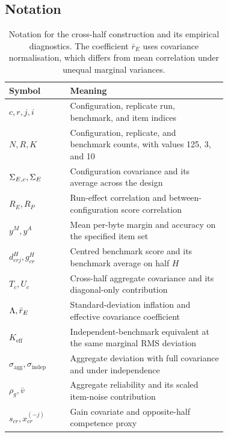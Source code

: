 \subsection{Notation}
\begin{table}[h]
\centering
\caption{Notation for the cross-half construction and its empirical diagnostics. The coefficient $\bar r_E$ uses covariance normalisation, which differs from mean correlation under unequal marginal variances.}
\small\setlength{\tabcolsep}{4pt}\renewcommand{\arraystretch}{1.12}
\begin{tabular}{lL{0.72\linewidth}}
\toprule
Symbol & Meaning\\
\midrule
$c,r,j,i$ & Configuration, replicate run, benchmark, and item indices\\
$N,R,K$ & Configuration, replicate, and benchmark counts, with values 125, 3, and 10\\
$\Sigma_{E,c},\Sigma_E$ & Configuration covariance and its average across the design\\
$R_E,R_P$ & Run-effect correlation and between-configuration score correlation\\
$y^M,y^A$ & Mean per-byte margin and accuracy on the specified item set\\
$d^H_{crj},g^H_{cr}$ & Centred benchmark score and its benchmark average on half $H$\\
$T_c,U_c$ & Cross-half aggregate covariance and its diagonal-only contribution\\
$\Lambda,\bar r_E$ & Standard-deviation inflation and effective covariance coefficient\\
$K_{\mathrm{eff}}$ & Independent-benchmark equivalent at the same marginal RMS deviation\\
$\sigma_{\mathrm{agg}},\sigma_{\mathrm{indep}}$ & Aggregate deviation with full covariance and under independence\\
$\rho_g,\bar v$ & Aggregate reliability and its scaled item-noise contribution\\
$s_{cr},x_{cr}^{(-j)}$ & Gain covariate and opposite-half competence proxy\\
\bottomrule
\end{tabular}
\end{table}

